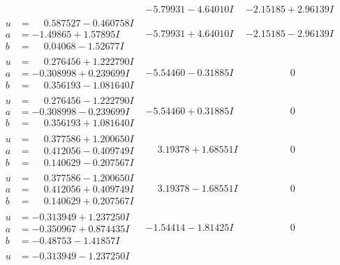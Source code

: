 \documentclass[1p]{elsarticle_modified}
\theoremstyle{definition}
\begin{document}
$$\begin{array}{c|c|c}
 & -5.79931 - 4.64010 I & -2.15185 + 2.96139 I \\ \hline\begin{aligned}
u &= \phantom{-}0.587527 - 0.460758 I \\
a &= -1.49865 + 1.57895 I \\
b &= \phantom{-}0.04068 - 1.52677 I\end{aligned}
 & -5.79931 + 4.64010 I & -2.15185 - 2.96139 I \\ \hline\begin{aligned}
u &= \phantom{-}0.276456 + 1.222790 I \\
a &= -0.308998 + 0.239699 I \\
b &= \phantom{-}0.356193 - 1.081640 I\end{aligned}
 & -5.54460 - 0.31885 I & \phantom{-0.000000 } 0 \\ \hline\begin{aligned}
u &= \phantom{-}0.276456 - 1.222790 I \\
a &= -0.308998 - 0.239699 I \\
b &= \phantom{-}0.356193 + 1.081640 I\end{aligned}
 & -5.54460 + 0.31885 I & \phantom{-0.000000 } 0 \\ \hline\begin{aligned}
u &= \phantom{-}0.377586 + 1.200650 I \\
a &= \phantom{-}0.412056 - 0.409749 I \\
b &= \phantom{-}0.140629 - 0.207567 I\end{aligned}
 & \phantom{-}3.19378 + 1.68551 I & \phantom{-0.000000 } 0 \\ \hline\begin{aligned}
u &= \phantom{-}0.377586 - 1.200650 I \\
a &= \phantom{-}0.412056 + 0.409749 I \\
b &= \phantom{-}0.140629 + 0.207567 I\end{aligned}
 & \phantom{-}3.19378 - 1.68551 I & \phantom{-0.000000 } 0 \\ \hline\begin{aligned}
u &= -0.313949 + 1.237250 I \\
a &= -0.350967 + 0.874435 I \\
b &= -0.48753 - 1.41857 I\end{aligned}
 & -1.54414 - 1.81425 I & \phantom{-0.000000 } 0 \\ \hline\begin{aligned}
u &= -0.313949 - 1.237250 I \\

\end{aligned}
\end{array}$$
\end{document}
